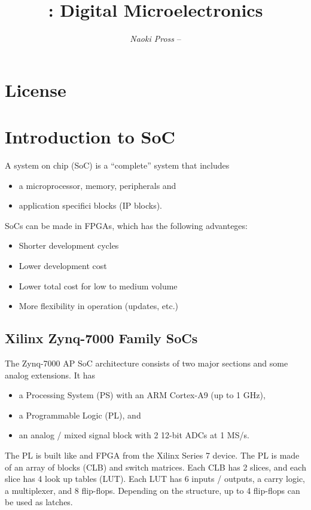 \documentclass[margin=small]{tex/hsrzf}
\author{\textsl{Naoki Pross} -- \texttt{\theauthoremail}}
\title{\texttt{\themodule}: Digital Microelectronics}
\date{\thesemester}
\begin{document}
\maketitle
\tableofcontents

\section{License}
\doclicenseThis

\twocolumn
\setcounter{page}{1}

\section{Introduction to SoC}

A system on chip (SoC) is a ``complete'' system that includes
\begin{itemize}
  \item a microprocessor, memory, peripherals and
  \item application specifici blocks (IP blocks).
\end{itemize}
SoCs can be made in FPGAs, which has the following advanteges:
\begin{itemize}
  \item Shorter development cycles
  \item Lower development cost
  \item Lower total cost for low to medium volume
    \item More flexibility in operation (updates, etc.)
\end{itemize}

\subsection{Xilinx Zynq-7000 Family SoCs}

The Zynq-7000 AP SoC architecture consists of two major sections and some analog extensions. It has 
\begin{itemize}
  \item a Processing System (PS) with an ARM Cortex-A9 (up to 1 GHz),
  \item a Programmable Logic (PL), and 
  \item an analog / mixed signal block with 2 12-bit ADCs at 1 MS/s.
\end{itemize}

The PL is built like and FPGA from the Xilinx Series 7 device. The PL is made of an array of blocks (CLB) and switch matrices. Each CLB has 2 slices, and each slice has 4 look up tables (LUT). Each LUT has 6 inputs / outputs, a carry logic, a multiplexer, and 8 flip-flops. Depending on the structure, up to 4 flip-flops can be used as latches.
\end{document}
